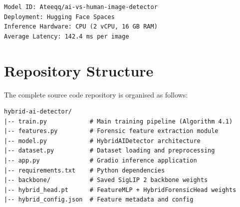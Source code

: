 \begin{small}
\begin{verbatim}
Model ID: Ateeqq/ai-vs-human-image-detector
Deployment: Hugging Face Spaces
Inference Hardware: CPU (2 vCPU, 16 GB RAM)
Average Latency: 142.4 ms per image
\end{verbatim}
\end{small}

\section{Repository Structure}

The complete source code repository is organised as follows:

\begin{small}
\begin{verbatim}
hybrid-ai-detector/
|-- train.py            # Main training pipeline (Algorithm 4.1)
|-- features.py         # Forensic feature extraction module
|-- model.py            # HybridAIDetector architecture
|-- dataset.py          # Dataset loading and preprocessing
|-- app.py              # Gradio inference application
|-- requirements.txt    # Python dependencies
|-- backbone/           # Saved SigLIP 2 backbone weights
|-- hybrid_head.pt      # FeatureMLP + HybridForensicHead weights
|-- hybrid_config.json  # Feature metadata and config
\end{verbatim}
\end{small}
